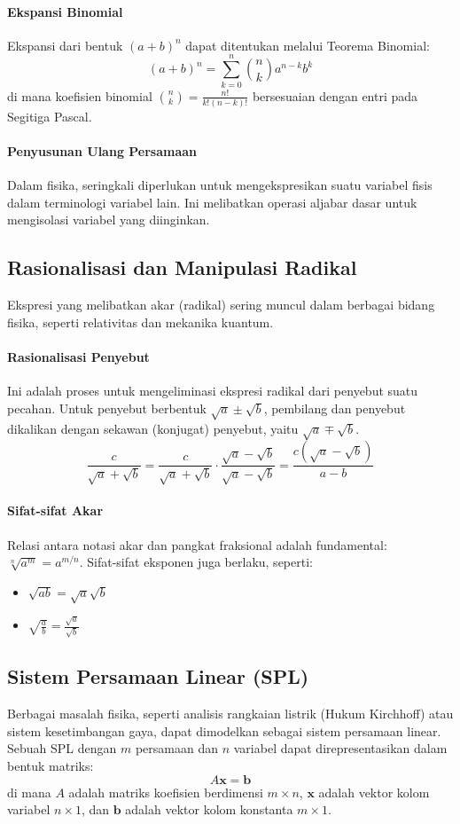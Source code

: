 \documentclass[12pt, a4paper]{article}
\begin{document}
\paragraph{Ekspansi Binomial}
Ekspansi dari bentuk $(a+b)^n$ dapat ditentukan melalui Teorema Binomial:
    \[
    (a+b)^n = \sum_{k=0}^{n} \binom{n}{k} a^{n-k} b^k
    \]
    di mana koefisien binomial $\binom{n}{k} = \frac{n!}{k!(n-k)!}$ bersesuaian dengan entri pada Segitiga Pascal.

\paragraph{Penyusunan Ulang Persamaan}
Dalam fisika, seringkali diperlukan untuk mengekspresikan suatu variabel fisis dalam terminologi variabel lain. Ini melibatkan operasi aljabar dasar untuk mengisolasi variabel yang diinginkan.

\subsection{Rasionalisasi dan Manipulasi Radikal}
Ekspresi yang melibatkan akar (radikal) sering muncul dalam berbagai bidang fisika, seperti relativitas dan mekanika kuantum.

\paragraph{Rasionalisasi Penyebut}
Ini adalah proses untuk mengeliminasi ekspresi radikal dari penyebut suatu pecahan. Untuk penyebut berbentuk $\sqrt{a} \pm \sqrt{b}$, pembilang dan penyebut dikalikan dengan sekawan (konjugat) penyebut, yaitu $\sqrt{a} \mp \sqrt{b}$.
\[
\frac{c}{\sqrt{a} + \sqrt{b}} = \frac{c}{\sqrt{a} + \sqrt{b}} \cdot \frac{\sqrt{a} - \sqrt{b}}{\sqrt{a} - \sqrt{b}} = \frac{c(\sqrt{a} - \sqrt{b})}{a - b}
\]

\paragraph{Sifat-sifat Akar}
Relasi antara notasi akar dan pangkat fraksional adalah fundamental: $\sqrt[n]{a^m} = a^{m/n}$. Sifat-sifat eksponen juga berlaku, seperti:
\begin{itemize}
    \item $\sqrt{ab} = \sqrt{a}\sqrt{b}$
    \item $\sqrt{\frac{a}{b}} = \frac{\sqrt{a}}{\sqrt{b}}$
\end{itemize}

\subsection{Sistem Persamaan Linear (SPL)}
Berbagai masalah fisika, seperti analisis rangkaian listrik (Hukum Kirchhoff) atau sistem kesetimbangan gaya, dapat dimodelkan sebagai sistem persamaan linear. Sebuah SPL dengan $m$ persamaan dan $n$ variabel dapat direpresentasikan dalam bentuk matriks:
\[
A\mathbf{x} = \mathbf{b}
\]
di mana $A$ adalah matriks koefisien berdimensi $m \times n$, $\mathbf{x}$ adalah vektor kolom variabel $n \times 1$, dan $\mathbf{b}$ adalah vektor kolom konstanta $m \times 1$.
\end{document}
